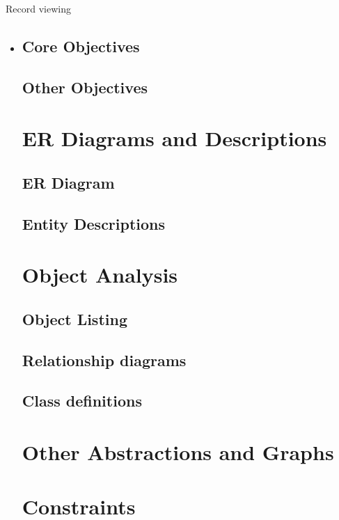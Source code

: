 \documentclass[a4paper,12pt]{report}
\begin{document}
Record viewing
\begin{itemize}
	\item 

\subsection{Core Objectives}

\subsection{Other Objectives}

\section{ER Diagrams and Descriptions}

\subsection{ER Diagram}

\subsection{Entity Descriptions}

\section{Object Analysis}

\subsection{Object Listing}

\subsection{Relationship diagrams}

\subsection{Class definitions}

\section{Other Abstractions and Graphs}

\section{Constraints}


\end{itemize}
\end{document}
